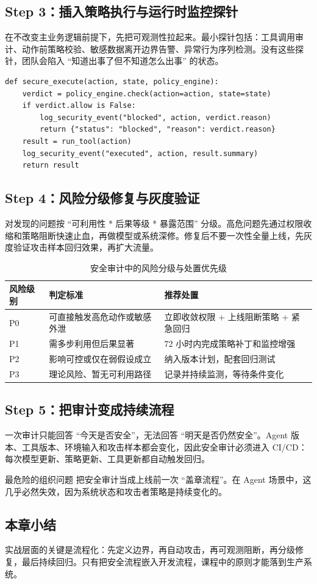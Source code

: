 \subsection{Step 3：插入策略执行与运行时监控探针}
在不改变主业务逻辑前提下，先把可观测性拉起来。最小探针包括：工具调用审计、动作前策略校验、敏感数据离开边界告警、异常行为序列检测。没有这些探针，团队会陷入 ``知道出事了但不知道怎么出事'' 的状态。

\begin{lstlisting}[caption={动作执行前安全检查示意}]
def secure_execute(action, state, policy_engine):
    verdict = policy_engine.check(action=action, state=state)
    if verdict.allow is False:
        log_security_event("blocked", action, verdict.reason)
        return {"status": "blocked", "reason": verdict.reason}
    result = run_tool(action)
    log_security_event("executed", action, result.summary)
    return result
\end{lstlisting}

\subsection{Step 4：风险分级修复与灰度验证}
对发现的问题按 ``可利用性 * 后果等级 * 暴露范围'' 分级。高危问题先通过权限收缩和策略阻断快速止血，再做模型或系统深修。修复后不要一次性全量上线，先灰度验证攻击样本回归效果，再扩大流量。

\begin{table}[H]
\centering
\begin{tabular}{p{2.0cm}p{3.5cm}p{4.8cm}}
\toprule
\textbf{风险级别} & \textbf{判定标准} & \textbf{推荐处置} \\
\midrule
P0 & 可直接触发高危动作或敏感外泄 & 立即收敛权限 + 上线阻断策略 + 紧急回归 \\
P1 & 需多步利用但后果显著 & 72 小时内完成策略补丁和监控增强 \\
P2 & 影响可控或仅在弱假设成立 & 纳入版本计划，配套回归测试 \\
P3 & 理论风险、暂无可利用路径 & 记录并持续监测，等待条件变化 \\
\bottomrule
\end{tabular}
\caption{安全审计中的风险分级与处置优先级}
\end{table}

\subsection{Step 5：把审计变成持续流程}
一次审计只能回答 ``今天是否安全''，无法回答 ``明天是否仍然安全''。Agent 版本、工具版本、环境输入和攻击样本都会变化，因此安全审计必须进入 CI/CD：每次模型更新、策略更新、工具更新都自动触发回归。

\begin{warningbox}{最危险的组织问题}
把安全审计当成上线前一次 ``盖章流程''。在 Agent 场景中，这几乎必然失效，因为系统状态和攻击者策略是持续变化的。
\end{warningbox}

\subsection{本章小结}
实战层面的关键是流程化：先定义边界，再自动攻击，再可观测阻断，再分级修复，最后持续回归。只有把安全流程嵌入开发流程，课程中的原则才能落到生产系统。

